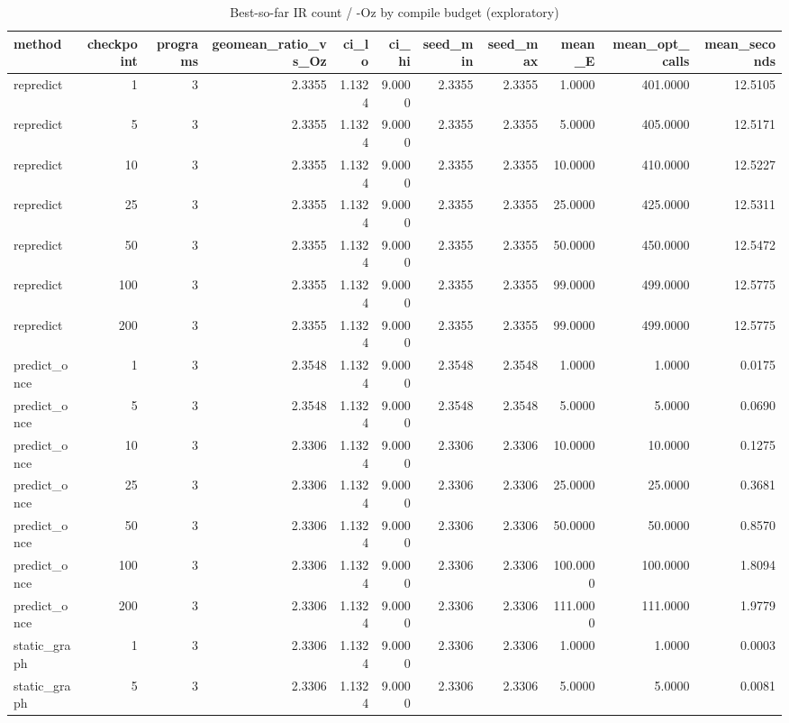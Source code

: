 \begin{table}[t]
\centering
\caption{Best-so-far IR count / -Oz by compile budget (exploratory)}
\label{tab:v3-1-budget-curves}
\begin{tabular}{lrrrrrrrrrr}
\toprule
method & checkpoint & programs & geomean\_ratio\_vs\_Oz & ci\_lo & ci\_hi & seed\_min & seed\_max & mean\_E & mean\_opt\_calls & mean\_seconds \\
\midrule
repredict & 1 & 3 & 2.3355 & 1.1324 & 9.0000 & 2.3355 & 2.3355 & 1.0000 & 401.0000 & 12.5105 \\
repredict & 5 & 3 & 2.3355 & 1.1324 & 9.0000 & 2.3355 & 2.3355 & 5.0000 & 405.0000 & 12.5171 \\
repredict & 10 & 3 & 2.3355 & 1.1324 & 9.0000 & 2.3355 & 2.3355 & 10.0000 & 410.0000 & 12.5227 \\
repredict & 25 & 3 & 2.3355 & 1.1324 & 9.0000 & 2.3355 & 2.3355 & 25.0000 & 425.0000 & 12.5311 \\
repredict & 50 & 3 & 2.3355 & 1.1324 & 9.0000 & 2.3355 & 2.3355 & 50.0000 & 450.0000 & 12.5472 \\
repredict & 100 & 3 & 2.3355 & 1.1324 & 9.0000 & 2.3355 & 2.3355 & 99.0000 & 499.0000 & 12.5775 \\
repredict & 200 & 3 & 2.3355 & 1.1324 & 9.0000 & 2.3355 & 2.3355 & 99.0000 & 499.0000 & 12.5775 \\
predict\_once & 1 & 3 & 2.3548 & 1.1324 & 9.0000 & 2.3548 & 2.3548 & 1.0000 & 1.0000 & 0.0175 \\
predict\_once & 5 & 3 & 2.3548 & 1.1324 & 9.0000 & 2.3548 & 2.3548 & 5.0000 & 5.0000 & 0.0690 \\
predict\_once & 10 & 3 & 2.3306 & 1.1324 & 9.0000 & 2.3306 & 2.3306 & 10.0000 & 10.0000 & 0.1275 \\
predict\_once & 25 & 3 & 2.3306 & 1.1324 & 9.0000 & 2.3306 & 2.3306 & 25.0000 & 25.0000 & 0.3681 \\
predict\_once & 50 & 3 & 2.3306 & 1.1324 & 9.0000 & 2.3306 & 2.3306 & 50.0000 & 50.0000 & 0.8570 \\
predict\_once & 100 & 3 & 2.3306 & 1.1324 & 9.0000 & 2.3306 & 2.3306 & 100.0000 & 100.0000 & 1.8094 \\
predict\_once & 200 & 3 & 2.3306 & 1.1324 & 9.0000 & 2.3306 & 2.3306 & 111.0000 & 111.0000 & 1.9779 \\
static\_graph & 1 & 3 & 2.3306 & 1.1324 & 9.0000 & 2.3306 & 2.3306 & 1.0000 & 1.0000 & 0.0003 \\
static\_graph & 5 & 3 & 2.3306 & 1.1324 & 9.0000 & 2.3306 & 2.3306 & 5.0000 & 5.0000 & 0.0081 \\

\end{tabular}
\end{table}

